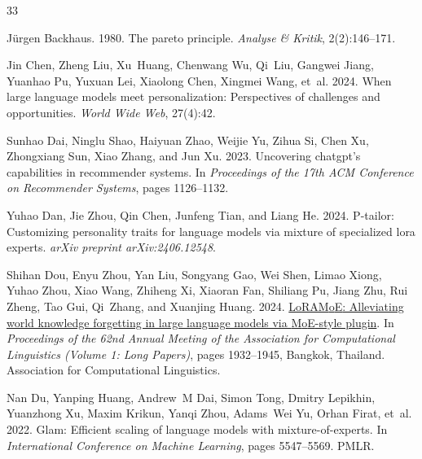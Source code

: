 \documentclass[11pt]{article}
\begin{document}
%
% 

\begin{thebibliography}{33}
\providecommand{\natexlab}[1]{#1}

J{\"u}rgen Backhaus. 1980.
\newblock The pareto principle.
\newblock \emph{Analyse \& Kritik}, 2(2):146--171.

Jin Chen, Zheng Liu, Xu~Huang, Chenwang Wu, Qi~Liu, Gangwei Jiang, Yuanhao Pu, Yuxuan Lei, Xiaolong Chen, Xingmei Wang, et~al. 2024.
\newblock When large language models meet personalization: Perspectives of challenges and opportunities.
\newblock \emph{World Wide Web}, 27(4):42.

Sunhao Dai, Ninglu Shao, Haiyuan Zhao, Weijie Yu, Zihua Si, Chen Xu, Zhongxiang Sun, Xiao Zhang, and Jun Xu. 2023.
\newblock Uncovering chatgpt’s capabilities in recommender systems.
\newblock In \emph{Proceedings of the 17th ACM Conference on Recommender Systems}, pages 1126--1132.

Yuhao Dan, Jie Zhou, Qin Chen, Junfeng Tian, and Liang He. 2024.
\newblock P-tailor: Customizing personality traits for language models via mixture of specialized lora experts.
\newblock \emph{arXiv preprint arXiv:2406.12548}.

Shihan Dou, Enyu Zhou, Yan Liu, Songyang Gao, Wei Shen, Limao Xiong, Yuhao Zhou, Xiao Wang, Zhiheng Xi, Xiaoran Fan, Shiliang Pu, Jiang Zhu, Rui Zheng, Tao Gui, Qi~Zhang, and Xuanjing Huang. 2024.
\newblock \href {https://doi.org/10.18653/v1/2024.acl-long.106} {{L}o{RAM}o{E}: Alleviating world knowledge forgetting in large language models via {M}o{E}-style plugin}.
\newblock In \emph{Proceedings of the 62nd Annual Meeting of the Association for Computational Linguistics (Volume 1: Long Papers)}, pages 1932--1945, Bangkok, Thailand. Association for Computational Linguistics.

Nan Du, Yanping Huang, Andrew~M Dai, Simon Tong, Dmitry Lepikhin, Yuanzhong Xu, Maxim Krikun, Yanqi Zhou, Adams~Wei Yu, Orhan Firat, et~al. 2022.
\newblock Glam: Efficient scaling of language models with mixture-of-experts.
\newblock In \emph{International Conference on Machine Learning}, pages 5547--5569. PMLR.


\end{thebibliography}
\end{document}
